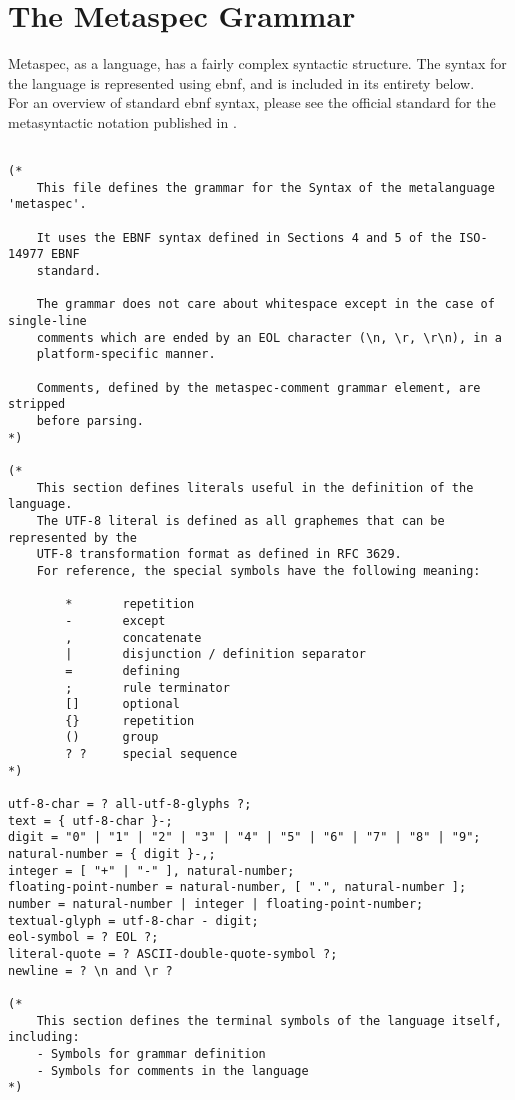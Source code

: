 \chapter{The Metaspec Grammar} %
\label{cha:the_metaspec_grammar}
Metaspec, as a language, has a fairly complex syntactic structure. 
The syntax for the language is represented using \gls{ebnf}, and is included in its entirety below. \\

For an overview of standard \gls{ebnf} syntax, please see the official standard for the metasyntactic notation published in \citet{standard1996ebnf}.

\begin{lstlisting}

(*
    This file defines the grammar for the Syntax of the metalanguage 'metaspec'.

    It uses the EBNF syntax defined in Sections 4 and 5 of the ISO-14977 EBNF
    standard.

    The grammar does not care about whitespace except in the case of single-line
    comments which are ended by an EOL character (\n, \r, \r\n), in a
    platform-specific manner.

    Comments, defined by the metaspec-comment grammar element, are stripped 
    before parsing.
*)

(*
    This section defines literals useful in the definition of the language.
    The UTF-8 literal is defined as all graphemes that can be represented by the
    UTF-8 transformation format as defined in RFC 3629.
    For reference, the special symbols have the following meaning:

        *       repetition
        -       except
        ,       concatenate
        |       disjunction / definition separator
        =       defining
        ;       rule terminator
        []      optional
        {}      repetition
        ()      group
        ? ?     special sequence
*)

utf-8-char = ? all-utf-8-glyphs ?;
text = { utf-8-char }-;
digit = "0" | "1" | "2" | "3" | "4" | "5" | "6" | "7" | "8" | "9";
natural-number = { digit }-,;
integer = [ "+" | "-" ], natural-number;
floating-point-number = natural-number, [ ".", natural-number ];
number = natural-number | integer | floating-point-number;
textual-glyph = utf-8-char - digit;
eol-symbol = ? EOL ?;
literal-quote = ? ASCII-double-quote-symbol ?;
newline = ? \n and \r ?

(*
    This section defines the terminal symbols of the language itself, including:
    - Symbols for grammar definition
    - Symbols for comments in the language
*)


\end{lstlisting}
